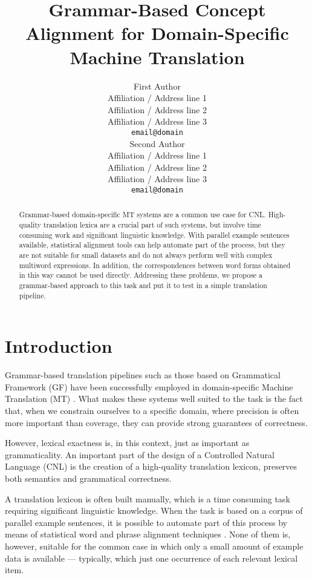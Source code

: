 \documentclass[11pt]{article}
\title{Grammar-Based Concept Alignment for Domain-Specific Machine Translation}
\author{First Author \\
  Affiliation / Address line 1 \\
  Affiliation / Address line 2 \\
  Affiliation / Address line 3 \\
  \texttt{email@domain} \\\And
  Second Author \\
  Affiliation / Address line 1 \\
  Affiliation / Address line 2 \\
  Affiliation / Address line 3 \\
  \texttt{email@domain} \\}
\begin{document}
\maketitle
\begin{abstract}
Grammar-based domain-specific MT systems are a common use case for CNL.
High-quality translation lexica are a crucial part of such systems, but involve time consuming work and significant linguistic knowledge. 
With parallel example sentences available, statistical alignment tools
can help automate part of the process, but they are not suitable for
small datasets and do not always perform well with complex multiword expressions. 
In addition, the correspondences between word forms obtained in this way cannot be used directly.
Addressing these problems, we propose a grammar-based approach to this task and put it to test in a simple translation pipeline.
\end{abstract}

\section{Introduction}
Grammar-based translation pipelines such as those based on Grammatical Framework (GF) have been successfully employed in domain-specific Machine Translation (MT) \cite{ranta-etal-2020-abstract}.  
What makes these systems well suited to the task is the fact that, when we constrain ourselves to a specific domain, where precision is often more important than coverage, they can provide strong guarantees of correctness. 

However, lexical exactness is, in this context, just as important as grammaticality. 
An important part of the design of a Controlled Natural Language (CNL) is the creation of a high-quality translation lexicon, preserves both semantics and grammatical correctness.

A translation lexicon is often built manually, which is a time consuming task requiring significant linguistic knowledge. 
When the task is based on a corpus of parallel example sentences, it is possible to automate part of this process by means of statistical word and phrase alignment techniques \cite{brown-etal-1993-mathematics, och-ney-2000-improved, dyer-etal-2013-simple}. 
None of them is, however, suitable for the common case in which only a small amount of example data is available --- typically, which just one occurrence of each relevant lexical item.
\end{document}

